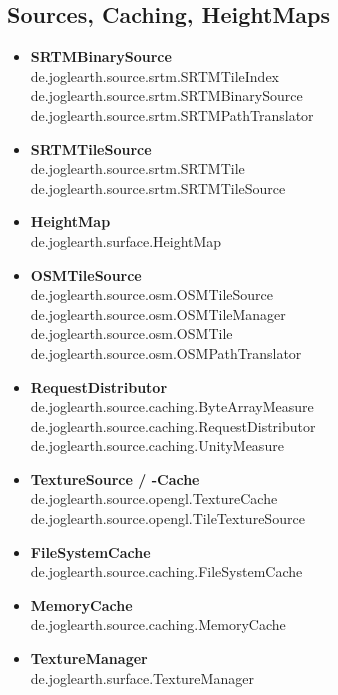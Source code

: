 \documentclass[10pt]{scrreprt}
\begin{document}
\subsection*{Sources, Caching, HeightMaps}
\begin{itemize}
\item \textbf{SRTMBinarySource}\\
de.joglearth.source.srtm.SRTMTileIndex\\
de.joglearth.source.srtm.SRTMBinarySource\\
de.joglearth.source.srtm.SRTMPathTranslator
\item \textbf{SRTMTileSource}\\
de.joglearth.source.srtm.SRTMTile\\
de.joglearth.source.srtm.SRTMTileSource
\item \textbf{HeightMap}\\
de.joglearth.surface.HeightMap
\item \textbf{OSMTileSource}\\
de.joglearth.source.osm.OSMTileSource\\
de.joglearth.source.osm.OSMTileManager\\
de.joglearth.source.osm.OSMTile\\
de.joglearth.source.osm.OSMPathTranslator
\item \textbf{RequestDistributor}\\
de.joglearth.source.caching.ByteArrayMeasure\\
de.joglearth.source.caching.RequestDistributor\\
de.joglearth.source.caching.UnityMeasure
\item \textbf{TextureSource / -Cache}\\
de.joglearth.source.opengl.TextureCache\\
de.joglearth.source.opengl.TileTextureSource
\item \textbf{FileSystemCache}\\
de.joglearth.source.caching.FileSystemCache
\item \textbf{MemoryCache}\\
de.joglearth.source.caching.MemoryCache
\item \textbf{TextureManager}\\
de.joglearth.surface.TextureManager
\end{itemize}
\end{document}
